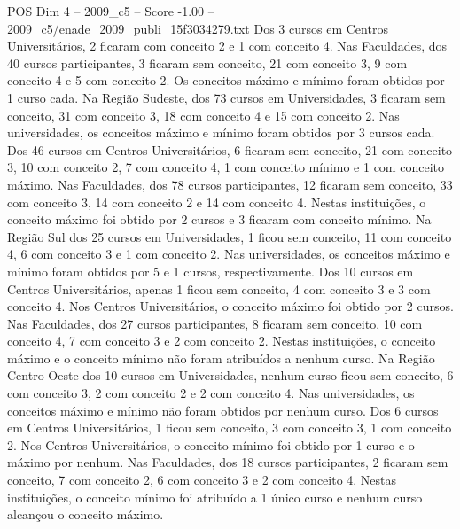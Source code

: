 \begin{textsample}{POS Dim 4 – 2009\_c5 – Score -1.00 – 2009\_c5/enade\_2009\_publi\_15f3034279.txt}
Dos 3 cursos em Centros Universitários, 2 ficaram com conceito 2 e 1 com conceito 4.
Nas Faculdades, dos 40 cursos participantes, 3 ficaram sem conceito, 21 com conceito 3, 9 com conceito 4 e 5 com conceito 2.
Os conceitos máximo e mínimo foram obtidos por 1 curso cada.
Na Região Sudeste, dos 73 cursos em Universidades, 3 ficaram sem conceito, 31 com conceito 3, 18 com conceito 4 e 15 com conceito 2.
Nas universidades, os conceitos máximo e mínimo foram obtidos por 3 cursos cada.
Dos 46 cursos em Centros Universitários, 6 ficaram sem conceito, 21 com conceito 3, 10 com conceito 2, 7 com conceito 4, 1 com conceito mínimo e 1 com conceito máximo.
Nas Faculdades, dos 78 cursos participantes, 12 ficaram sem conceito, 33 com conceito 3, 14 com conceito 2 e 14 com conceito 4.
Nestas instituições, o conceito máximo foi obtido por 2 cursos e 3 ficaram com conceito mínimo.
Na Região Sul dos 25 cursos em Universidades, 1 ficou sem conceito, 11 com conceito 4, 6 com conceito 3 e 1 com conceito 2.
Nas universidades, os conceitos máximo e mínimo foram obtidos por 5 e 1 cursos, respectivamente.
Dos 10 cursos em Centros Universitários, apenas 1 ficou sem conceito, 4 com conceito 3 e 3 com conceito 4.
Nos Centros Universitários, o conceito máximo foi obtido por 2 cursos.
Nas Faculdades, dos 27 cursos participantes, 8 ficaram sem conceito, 10 com conceito 4, 7 com conceito 3 e 2 com conceito 2.
Nestas instituições, o conceito máximo e o conceito mínimo não foram atribuídos a nenhum curso.
Na Região Centro-Oeste dos 10 cursos em Universidades, nenhum curso ficou sem conceito, 6 com conceito 3, 2 com conceito 2 e 2 com conceito 4.
Nas universidades, os conceitos máximo e mínimo não foram obtidos por nenhum curso.
Dos 6 cursos em Centros Universitários, 1 ficou sem conceito, 3 com conceito 3, 1 com conceito 2.
Nos Centros Universitários, o conceito mínimo foi obtido por 1 curso e o máximo por nenhum.
Nas Faculdades, dos 18 cursos participantes, 2 ficaram sem conceito, 7 com conceito 2, 6 com conceito 3 e 2 com conceito 4.
Nestas instituições, o conceito mínimo foi atribuído a 1 único curso e nenhum curso alcançou o conceito máximo.

\end{textsample}
